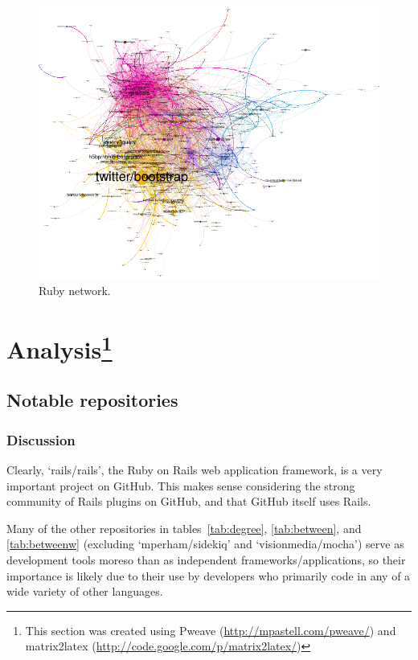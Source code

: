 \documentclass[11pt]{article}
\begin{document}
\begin{figure}[htbp]
    \centering
    \caption{Ruby network.}
    \label{fig:ruby}
\includegraphics[clip=true,trim=1in 2.25in 2.5in 0.5in,scale=2]{repositories-labeled.pdf}
\end{figure}

\section[Analysis]{Analysis\footnote{This section was created using Pweave
(\url{http://mpastell.com/pweave/}) and
matrix2latex (\url{http://code.google.com/p/matrix2latex/})}}

\subsection{Notable repositories}



\subsubsection{Discussion}
Clearly, `rails/rails', the Ruby on Rails web application framework, is a very
important project on GitHub. This makes sense considering the strong community
of Rails plugins on GitHub, and that GitHub itself uses Rails.

Many of the other repositories in tables~\ref{tab:degree}, \ref{tab:between},
and \ref{tab:betweenw} (excluding `mperham/sidekiq' and `visionmedia/mocha')
serve as development tools moreso than as independent frameworks/applications,
so their importance is likely due to their use by developers who primarily code
in any of a wide variety of other languages.
\end{document}
